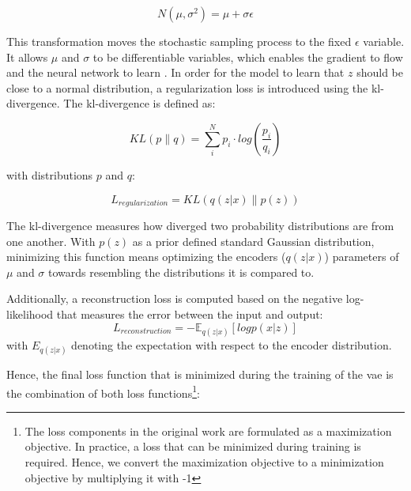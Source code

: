 \begin{equation}
  \label{eqn:reparameterization}
  N(\mu,\sigma^2) =\mu+\sigma\epsilon
\end{equation}


This transformation moves the stochastic sampling process to the fixed $\epsilon$ variable. 
It allows $\mu$ and $\sigma$ to be differentiable variables, which enables the gradient to flow and the neural network to learn \cite{kingma2013AutoEncodingVariationalBayes}.
In order for the model to learn that $z$ should be close to a normal distribution, a regularization loss is introduced using the \gls{kl}-divergence.
The \gls{kl}-divergence is defined as:

\begin{equation}
    \label{eqn:kl-divergence}
    KL(p\parallel q) = \sum_{i}^{N}p_i\cdot log(\frac{p_i}{q_i})
\end{equation}

with distributions $p$ and $q$:

\begin{equation}
    \label{eqn:regularization_loss}
    L_{regularization} = KL(q(z|x) \parallel p(z))
\end{equation}

The \gls{kl}-divergence measures how diverged two probability distributions are from one another.
With $p(z)$ as a prior defined standard Gaussian distribution, minimizing this function means optimizing the encoders ($q(z|x)$) parameters of $\mu$ and $\sigma$ towards resembling the distributions it is compared to.

Additionally, a reconstruction loss is computed based on the negative log-likelihood that measures the error between the input and output:
\begin{equation}
    \label{eqn:reconstruction_loss}
    L_{reconstruction} =-\mathbb{E}_{q(z|x)}[logp(x|z)]
\end{equation}
with $E_{q(z|x)}$ denoting the expectation with respect to the encoder distribution.

Hence, the final loss function that is minimized during the training of the \gls{vae} is the combination of both loss functions\footnote{The loss components in the original work \cite{kingma2013AutoEncodingVariationalBayes} are formulated as a maximization objective. In practice, a loss that can be minimized during training is required. Hence, we convert the maximization objective to a minimization objective by multiplying it with -1}:

